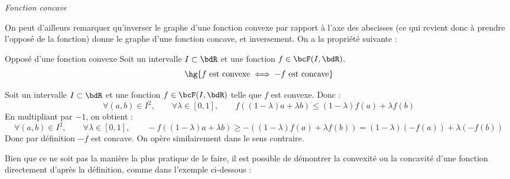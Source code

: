 \documentclass[a4paper,french,bookmarks]{article}
\begin{document}
\begin{center}
\begin{minipage}{0.35\linewidth}
        
        \textit{\color{main1}\EBGaramond Fonction concave}
    \end{minipage}
\end{center}


On peut d'ailleurs remarquer qu'inverser le graphe d'une fonction convexe par rapport à l'axe des abscisses (ce qui revient donc à prendre l'opposé de la fonction) donne le graphe d'une fonction concave, et inversement. On a la propriété suivante :

\begin{property}{Opposé d'une fonction convexe}{}
    Soit un intervalle $I \subset \bdR$ et une fonction $f \in \bcF(I, \bdR)$. 
    \[ \hg{f \ \text{est convexe} \iff -f \ \text{est concave}}\]
\end{property}

\begin{nproof}
    Soit un intervalle $I \subset \bdR$ et une fonction $f \in \bcF(I, \bdR)$ telle que $f$ est convexe. Donc :
    \[ \forall (a, b) \in I^2,\qquad \forall \lambda \in [0, 1],\qquad f\left((1-\lambda)a + \lambda b\right) \leq (1-\lambda)f(a) + \lambda f(b)\]
    En multipliant par $-1$, on obtient :
    \[ \forall (a, b) \in I^2,\qquad \forall \lambda \in [0, 1],\qquad -f\left((1-\lambda)a + \lambda b\right) \geq -\left((1-\lambda)f(a) + \lambda f(b)\right) = (1-\lambda)\left(-f(a)\right) +\lambda\left(-f(b)\right)\]
    Donc par définition $-f$ est concave. On opère similairement dans le sens contraire.
\end{nproof}

Bien que ce ne soit pas la manière la plus pratique de le faire, il est possible de démontrer la convexité ou la concavité d'une fonction directement d'après la définition, comme dans l'exemple ci-dessous :
\end{document}
